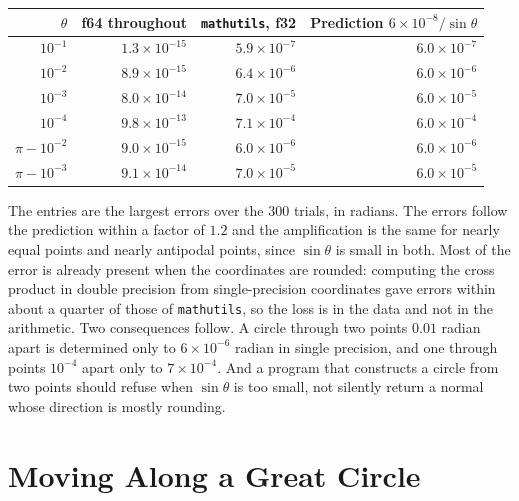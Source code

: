 \begin{center}
\begin{tabular}{rrrr}
\toprule
$\theta$ & f64 throughout & \texttt{mathutils}, f32 & Prediction $6\times10^{-8}/\sin\theta$\\
\midrule
$10^{-1}$ & $1.3\times10^{-15}$ & $5.9\times10^{-7}$ & $6.0\times10^{-7}$\\
$10^{-2}$ & $8.9\times10^{-15}$ & $6.4\times10^{-6}$ & $6.0\times10^{-6}$\\
$10^{-3}$ & $8.0\times10^{-14}$ & $7.0\times10^{-5}$ & $6.0\times10^{-5}$\\
$10^{-4}$ & $9.8\times10^{-13}$ & $7.1\times10^{-4}$ & $6.0\times10^{-4}$\\
$\pi-10^{-2}$ & $9.0\times10^{-15}$ & $6.0\times10^{-6}$ & $6.0\times10^{-6}$\\
$\pi-10^{-3}$ & $9.1\times10^{-14}$ & $7.0\times10^{-5}$ & $6.0\times10^{-5}$\\
\bottomrule
\end{tabular}
\end{center}

The entries are the largest errors over the $300$ trials, in radians. The errors follow the prediction within a factor of $1.2$ and the amplification is the same for nearly equal points and nearly antipodal points, since $\sin\theta$ is small in both. Most of the error is already present when the coordinates are rounded: computing the cross product in double precision from single-precision coordinates gave errors within about a quarter of those of \texttt{mathutils}, so the loss is in the data and not in the arithmetic. Two consequences follow. A circle through two points $0.01$ radian apart is determined only to $6\times10^{-6}$ radian in single precision, and one through points $10^{-4}$ apart only to $7\times10^{-4}$. And a program that constructs a circle from two points should refuse when $\sin\theta$ is too small, not silently return a normal whose direction is mostly rounding.

\section{Moving Along a Great Circle}

